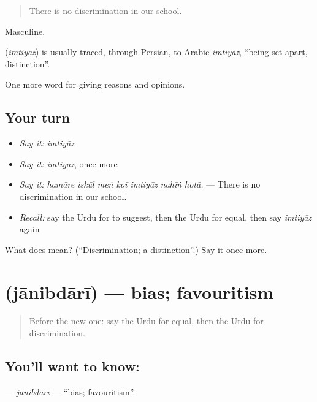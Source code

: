 \begin{quote}
There is no discrimination in our school.
\end{quote}

Masculine.

\begin{cousinweb}
\textbf{} (\emph{imtiyāz}) is usually traced, through Persian, to Arabic \emph{imtiyāz}, \textquotedblleft{}being set apart, distinction\textquotedblright{}.
\end{cousinweb}

\begin{grammarlens}[title={What you've built}]
One more word for giving reasons and opinions.
\end{grammarlens}

\subsection*{Your turn}
\begin{itemize}
\raggedright
  \item \emph{Say it:} \emph{imtiyāz}
  \item \emph{Say it:} \emph{imtiyāz}, once more
  \item \emph{Say it:} \emph{hamāre iskūl meṅ koī imtiyāz nahīṅ hotā.} — There is no discrimination in our school.
  \item \emph{Recall:} say the Urdu for to suggest, then the Urdu for equal, then say \emph{imtiyāz} again
\end{itemize}

\begin{tcolorbox}[breakable,colback=teal!4,colframe=teal!35!black,title={Before you move on}]
What does  mean? (\textquotedblleft{}Discrimination; a distinction\textquotedblright{}.) Say it once more.
\end{tcolorbox}
\section[\texorpdfstring{\ur{جانبداری} (jānibdārī)}{جانبداری (jānibdārī)}]{ (jānibdārī) — bias; favouritism}

\label{lesson:UR-C344-janibdari}



\begin{quote}
Before the new one: say the Urdu for equal, then the Urdu for discrimination.
\end{quote}

\subsection*{You'll want to know: }
\textbf{} — \emph{jānibdārī} — \textquotedblleft{}bias; favouritism\textquotedblright{}.

